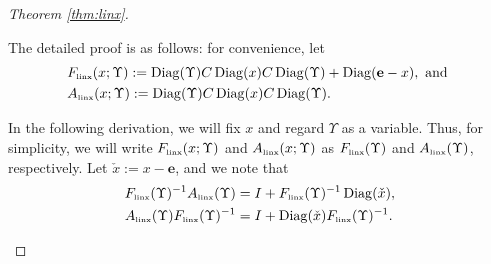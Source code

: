 \documentclass[smallextended]{svjour3hack}       %
\DeclareMathOperator{\Diag}{Diag}
\begin{document}
\begin{proof}[Theorem \ref{thm:linx}]
\begin{itemize}
    \smallskip
    The detailed proof is as follows: for convenience, let
    \begin{align*}
    &F_{{\tiny\mbox{linx}}}(x;\Upsilon):=  \Diag(\Upsilon) C\Diag(x)C \Diag(\Upsilon)+ \Diag(\mathbf{e}-x), \mbox{ and }\\
    &A_{{\tiny\mbox{linx}}}(x;\Upsilon):=\Diag(\Upsilon) C\Diag(x)C \Diag(\Upsilon).
    \end{align*}


    In the following derivation, we will fix $x$ and regard $\Upsilon$ as a variable. Thus, for simplicity, we will write $F_{{\tiny\mbox{linx}}}(x;\Upsilon)$ and  $A_{{\tiny\mbox{linx}}}(x;\Upsilon)$ as $F_{{\tiny\mbox{linx}}}(\Upsilon)$ and $A_{{\tiny\mbox{linx}}}(\Upsilon)$, respectively.
     Let  $\check{x}:=x-\mathbf{e}$, and we note that
     \begin{align}
     &F_{{\tiny\mbox{linx}}}(\Upsilon)^{-1}A_{{\tiny\mbox{linx}}}(\Upsilon) = I + F_{{\tiny\mbox{linx}}}(\Upsilon)^{-1}\Diag(\check{x}),\label{FAlinx}\\
      &A_{{\tiny\mbox{linx}}}(\Upsilon)F_{{\tiny\mbox{linx}}}(\Upsilon)^{-1} = I + \Diag(\check{x})F_{{\tiny\mbox{linx}}}(\Upsilon)^{-1}.\label{AFlinx}
    \end{align}


    \medskip


\end{itemize}
\end{proof}
\end{document}
